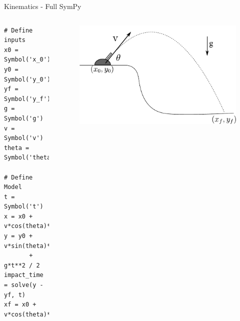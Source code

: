 \documentclass[compress, blue]{beamer}
\begin{document}
\begin{frame}{Kinematics - Full SymPy}
\begin{columns}

\begin{lstlisting}
# Define inputs
x0 = Symbol('x_0')
y0 = Symbol('y_0') 
yf = Symbol('y_f')
g = Symbol('g')
v = Symbol('v')
theta = Symbol('theta')

# Define Model
t = Symbol('t') 
x = x0 + v*cos(theta)*t
y = y0 + v*sin(theta)*t 
       + g*t**2 / 2
impact_time = solve(y - yf, t)
xf = x0 + v*cos(theta)*impact_time

\end{lstlisting}

    \begin{figure}
        \includegraphics[width=\textwidth]{images/cannon.pdf}
    \end{figure}
\end{columns}
\end{frame}
\end{document}
